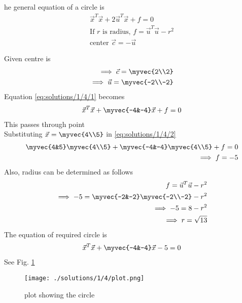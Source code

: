 he general equation of a circle is
\begin{align}
   \vec{x}^T\vec{x}+2\vec{u}^T\vec{x}+f=0\label{eq:solutions/1/4/1} \\
   \text{If $r$ is radius,  }f=\vec{u}^T\vec{u}-r^2\\
   \text{center }\vec{c}=-\vec{u}
\end{align}

Given centre is 
\begin{align}
    \implies \vec{c}=\myvec{2\\2}\\
    \implies \vec{u}=\myvec{-2\\-2}
\end{align}
Equation \eqref{eq:solutions/1/4/1} becomes
\begin{align}
  \vec{x}^T\vec{x}+\myvec{-4&-4}\vec{x}+f=0\label{eq:solutions/1/4/2}
\end{align}
This passes through point \\
Substituting $\vec{x}=\myvec{4\\5}$ in \eqref{eq:solutions/1/4/2}
\begin{align}
\myvec{4&5}\myvec{4\\5}+\myvec{-4&-4}\myvec{4\\5}+f=0\\
\implies f=-5
\end{align}
Also, radius can be determined as follows
\begin{align}
  f=\vec{u}^T\vec{u}-r^2 \\
  \implies -5=\myvec{-2&-2}\myvec{-2\\-2}-r^2\\
  \implies -5=8-r^2\\
  \implies r=\sqrt{13}
\end{align}
The equation of required circle is 
\begin{align}
  \vec{x}^T\vec{x}+\myvec{-4&-4}\vec{x}-5=0
\end{align}
See Fig. \ref{eq:solutions/1/4/Fig}

\begin{figure}[!ht]
\centering
\texttt{[image: ./solutions/1/4/plot.png]}
\caption{plot showing the circle}
\label{eq:solutions/1/4/Fig}
\end{figure}
